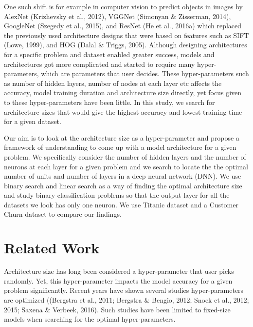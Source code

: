 \documentclass[runningheads]{llncs}
\begin{document}
One such shift is for example in computer vision to predict objects in images by AlexNet (Krizhevsky
et al., 2012), VGGNet (Simonyan \& Zisserman, 2014), GoogleNet (Szegedy et al., 2015), and
ResNet (He et al., 2016a) which replaced the previously used architecture designs that were based on features such as SIFT (Lowe, 1999), and HOG (Dalal & Triggs, 2005). Although designing architectures for a specific problem and dataset enabled greater success, models and architectures got more complicated and started to require many hyper-parameters, which are parameters that user decides. These hyper-parameters such as number of hidden layers, number of nodes at each layer etc affects the accuracy, model training duration and architecture size directly, yet focus given to these hyper-parameters have been little. In this study, we search for architecture sizes that would give the highest accuracy and lowest training time for a given dataset. 

Our aim is to look at the architecture size as a hyper-parameter and propose a framework of understanding to come up with a model architecture for a given problem. We specifically consider the number of hidden layers and the number of neurons at each layer for a given problem and we search to locate the the optimal number of units and number of layers in a deep neural network (DNN). We use binary search and linear search as a way of finding the optimal architecture size and study binary classification problems so that the output layer for all the datasets we look has only one neuron. We use Titanic dataset and a Customer Churn dataset to compare our findings. 


\section{Related Work}

Architecture size has long been considered a hyper-parameter that user picks randomly. Yet, this hyper-parameter impacts the model accuracy for a given problem significantly. Recent years have shown several studies hyper-parameters are optimized ((Bergstra et al., 2011; Bergstra & Bengio, 2012; Snoek et al., 2012; 2015; Saxena &
Verbeek, 2016). Such studies have been limited to fixed-size models when searching for the optimal hyper-parameters. 
\end{document}
